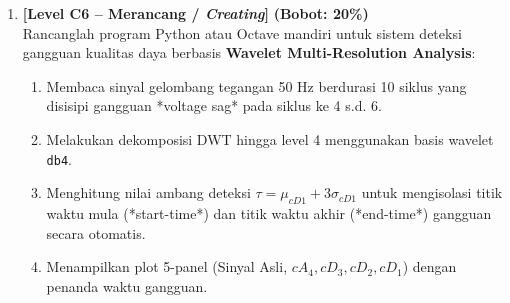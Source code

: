 \documentclass[11pt,a4paper]{article}
\begin{document}
\begin{enumerate}[leftmargin=1.5em, label=\textbf{Soal \arabic*.}]
    \vspace{0.4cm}

    \item \textbf{[Level C6 -- Merancang / \textit{Creating}]} \hfill \textbf{(Bobot: 20\%)} \\
    Rancanglah program Python atau Octave mandiri untuk sistem deteksi gangguan kualitas daya berbasis \textbf{Wavelet Multi-Resolution Analysis}:
    \begin{enumerate}[label=\alph*.]
        \item Membaca sinyal gelombang tegangan 50 Hz berdurasi 10 siklus yang disisipi gangguan *voltage sag* pada siklus ke 4 s.d. 6.
        \item Melakukan dekomposisi DWT hingga level 4 menggunakan basis wavelet \texttt{db4}.
        \item Menghitung nilai ambang deteksi $\tau = \mu_{cD1} + 3\sigma_{cD1}$ untuk mengisolasi titik waktu mula (*start-time*) dan titik waktu akhir (*end-time*) gangguan secara otomatis.
        \item Menampilkan plot 5-panel (Sinyal Asli, $cA_4, cD_3, cD_2, cD_1$) dengan penanda waktu gangguan.
    \end{enumerate}

\end{enumerate}
\end{document}
